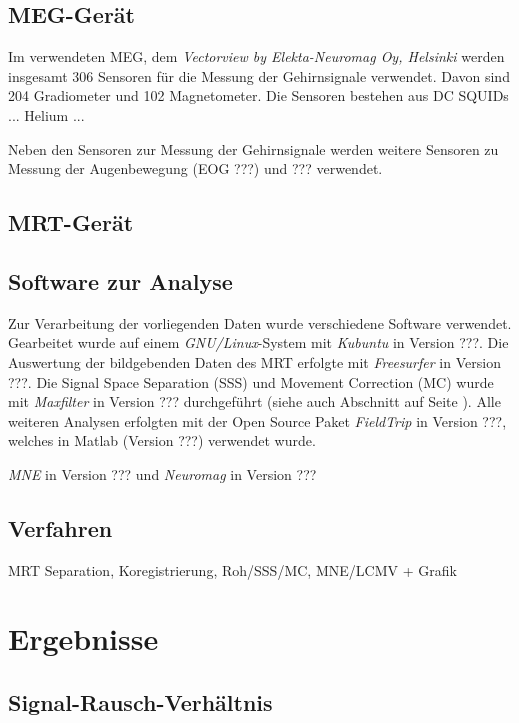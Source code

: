 \documentclass[doc,a4paper,12pt]{apa6}
\makeatletter
\DeclareRobustCommand*{\nameref}[1]{%
      \glqq{\myorg@nameref{#1}}\grqq%
    }%
\makeatother
\begin{document}
\subsection{MEG-Gerät}

Im verwendeten MEG, dem \emph{Vectorview by Elekta-Neuromag Oy, Helsinki} werden insgesamt 306 Sensoren für die Messung der Gehirnsignale verwendet. Davon sind 204 Gradiometer und 102 Magnetometer. Die Sensoren bestehen aus DC SQUIDs ... Helium ...

Neben den Sensoren zur Messung der Gehirnsignale werden weitere Sensoren zu Messung der Augenbewegung (EOG ???) und ??? verwendet.

\subsection{MRT-Gerät}



\subsection{Software zur Analyse}
\label{sec:software}

Zur Verarbeitung der vorliegenden Daten wurde verschiedene Software verwendet. Gearbeitet wurde auf einem \emph{GNU/Linux}-System mit \emph{Kubuntu} in Version ???. Die Auswertung der bildgebenden Daten des MRT erfolgte mit \emph{Freesurfer} in Version ???. Die Signal Space Separation (SSS) und Movement Correction (MC) wurde mit \emph{Maxfilter} in Version ??? durchgeführt (siehe auch Abschnitt \nameref{sec:maxfilter} auf Seite \pageref{sec:maxfilter}). Alle weiteren Analysen erfolgten mit der Open Source Paket \emph{FieldTrip} in Version ???, welches in Matlab (Version ???) verwendet wurde.

\emph{MNE} in Version ??? und \emph{Neuromag} in Version ??? 

\subsection{Verfahren}

MRT Separation, Koregistrierung, Roh/SSS/MC, MNE/LCMV + Grafik

\section{Ergebnisse}
\label{sec:ergebnisse}

\subsection{Signal-Rausch-Verhältnis}
\label{sec:snr}
\end{document}
